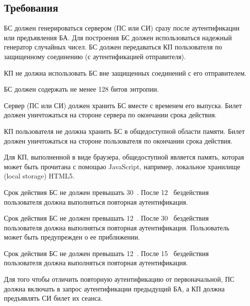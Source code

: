 \subsection{Требования}\label{SM.Reqs}

БС должен генерироваться сервером (ПС или СИ) сразу после аутентификации или 
предъявления БА. Для построения БС должен использоваться надежный генератор 
случайных чисел. БС должен передаваться КП пользователя по защищенному соединению
(с аутентификацией отправителя). 

КП не должна использовать БС вне защищенных соединений с его отправителем. 

БС должен содержать не менее 128 битов энтропии.


Сервер (ПС или СИ) должен хранить БС вместе с временем его выпуска.
Билет должен уничтожаться на стороне сервера по окончании срока действия.

КП пользователя не должна хранить БС в общедоступной области памяти.
Билет должен уничтожаться на стороне пользователя по окончании срока действия.

\begin{note*}
Для КП, выполненной в виде браузера, общедоступной является память,
которая может быть прочитана с помощью JavaScript, например,
локальное хранилище (local storage) HTML5.
%
\end{note*}

Срок действия БС не должен превышать 30~.
После 12~ бездействия пользователя 
должна выполняться повторная аутентификация.

Срок действия БС не должен превышать 12~.
После 30~ бездействия пользователя 
должна выполняться повторная аутентификация.
Пользователь может быть предупрежден о ее приближении.


Срок действия БС не должен превышать 12~.
После 15~ бездействия пользователя 
должна выполняться повторная аутентификация.


Для того чтобы отличить повторную аутентификацию от первоначальной,
ПС должна включать в запрос аутентификации предыдущий БА,
а КП должна предъявлять СИ билет их сеанса.

